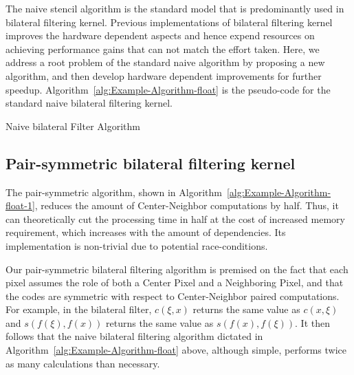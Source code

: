 \documentclass{IEEEtran}
\begin{document}
The naive stencil algorithm is the standard model that is predominantly used in bilateral filtering kernel. Previous implementations\cite{Paris2009,Pham2005} of bilateral filtering kernel improves the hardware dependent aspects and hence expend resources on achieving performance gains that can not match the effort taken. Here, we address a root problem of the standard naive algorithm by proposing a new algorithm, and then develop hardware dependent improvements for further speedup. Algorithm~\ref{alg:Example-Algorithm-float} is the pseudo-code for the standard naive bilateral filtering kernel.


\begin{algorithm}[!h]
\caption{Naive bilateral Filter Algorithm}
\label{alg:Example-Algorithm-float}
\begin{algorithmic}
\ENDFOR
\ENDFOR
{}
\ENDFOR
\end{algorithmic}
\end{algorithm}

\subsection{Pair-symmetric bilateral filtering kernel}
The pair-symmetric algorithm, shown in Algorithm~\ref{alg:Example-Algorithm-float-1}, reduces the amount of Center-Neighbor computations by half. Thus, it can theoretically cut the processing time in half at the cost of increased memory requirement, which increases with the amount of dependencies. Its implementation is non-trivial due to potential race-conditions.
	
Our pair-symmetric bilateral filtering algorithm is premised on the fact that each pixel assumes the role of both a Center Pixel and a Neighboring Pixel, and that the codes are symmetric with respect to Center-Neighbor paired computations. For example, in the bilateral filter, $c(\xi,x)$ returns the same value as $c(x,\xi)$ and $s(f(\xi),f(x))$ returns the same value as $s(f(x),f(\xi))$. It then follows that the naive bilateral filtering algorithm dictated in Algorithm~\ref{alg:Example-Algorithm-float} above, although simple, performs twice as many calculations than necessary.
\end{document}
